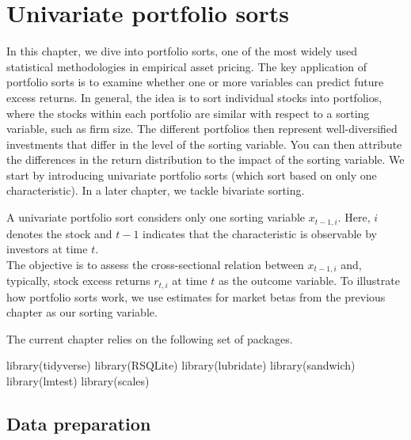 \documentclass[
]{book}
\newenvironment{Shaded}{\begin{snugshade}}{\end{snugshade}}
\newcommand{\FunctionTok}[1]{\textcolor[rgb]{0,0,0}{#1}}
\newcommand{\NormalTok}[1]{#1}
\begin{document}
\hypertarget{univariate-portfolio-sorts}{%
\chapter{Univariate portfolio sorts}\label{univariate-portfolio-sorts}}

In this chapter, we dive into portfolio sorts, one of the most widely used statistical methodologies in empirical asset pricing. The key application of portfolio sorts is to examine whether one or more variables can predict future excess returns. In general, the idea is to sort individual stocks into portfolios, where the stocks within each portfolio are similar with respect to a sorting variable, such as firm size. The different portfolios then represent well-diversified investments that differ in the level of the sorting variable. You can then attribute the differences in the return distribution to the impact of the sorting variable.
We start by introducing univariate portfolio sorts (which sort based on only one characteristic). In a later chapter, we tackle bivariate sorting.

A univariate portfolio sort considers only one sorting variable \(x_{t-1,i}\).
Here, \(i\) denotes the stock and \(t-1\) indicates that the characteristic is observable by investors at time \(t\).\\
The objective is to assess the cross-sectional relation between \(x_{t-1,i}\) and, typically, stock excess returns \(r_{t,i}\) at time \(t\) as the outcome variable.
To illustrate how portfolio sorts work, we use estimates for market betas from the previous chapter as our sorting variable.

The current chapter relies on the following set of packages.

\begin{Shaded}
\begin{Highlighting}[]
\FunctionTok{library}\NormalTok{(tidyverse)}
\FunctionTok{library}\NormalTok{(RSQLite)}
\FunctionTok{library}\NormalTok{(lubridate)}
\FunctionTok{library}\NormalTok{(sandwich)}
\FunctionTok{library}\NormalTok{(lmtest)}
\FunctionTok{library}\NormalTok{(scales)}
\end{Highlighting}
\end{Shaded}

\hypertarget{data-preparation}{%
\section{Data preparation}\label{data-preparation}}
\end{document}

